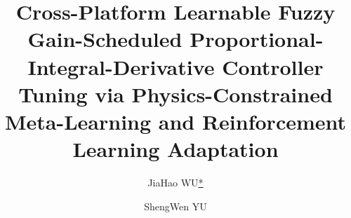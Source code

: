 \documentclass[DTMColor]{ROB-New}
\begin{document}
\let\WriteBookmarks\relax
\def\floatpagepagefraction{1}
\def\textpagefraction{.001}

\renewcommand{\topfraction}{0.9}       %
\renewcommand{\bottomfraction}{0.8}    %
\renewcommand{\textfraction}{0.07}     %
\renewcommand{\floatpagefraction}{0.95}
\renewcommand{\dblfloatpagefraction}{0.95}
\setcounter{topnumber}{3}              %
\setcounter{bottomnumber}{9}           %
\setcounter{totalnumber}{20}           %
\setcounter{dbltopnumber}{9}           %

\makeatletter
\setlength{\@fptop}{0pt}
\setlength{\@fpsep}{8pt}
\setlength{\@fpbot}{0pt}
\makeatother


\title{Cross-Platform Learnable Fuzzy Gain-Scheduled Proportional-Integral-Derivative Controller Tuning via Physics-Constrained Meta-Learning and Reinforcement Learning Adaptation}

\author[1]{JiaHao WU\hyperlink{corr}{*}}
\address[1]{The University of Hong Kong, Hong Kong, China}

\author[2]{ShengWen YU}
\address[2]{Guangzhou College of Commerce, Guangzhou, Guangdong, China}
\address{\hypertarget{corr}{*}Corresponding author. }


\end{document}
